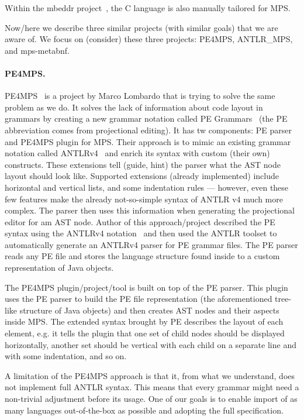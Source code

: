 Within the mbeddr project~\cite{ref:mbeddr}, the C language is also manually tailored for MPS.

Now/here we describe three similar projects (with similar goals) that we are aware of.
We focus on (consider) these three projects: PE4MPS, ANTLR{\_}MPS, and mps-metabnf.

\paragraph{PE4MPS.}
PE4MPS~\cite{ref:PE4MPS} is a project by Marco Lombardo that is trying to solve the same problem as we do.
It solves the lack of information about code layout in grammars by creating a new grammar notation called PE Grammars~\cite{ref:PE} (the PE abbreviation comes from projectional editing).
It has tw components: PE parser and PE4MPS plugin for MPS.
Their approach is to mimic an existing grammar notation called ANTLRv4~\cite{ANTLR4} and enrich its syntax with custom (their own) constructs.
These extensions tell (guide, hint) the parser what the AST node layout should look like.
Supported extensions (already implemented) include horizontal and vertical lists, and some indentation rules --- however, even these few features make the already not-so-simple syntax of ANTLR v4 much more complex.
The parser then uses this information when generating the projectional editor for am AST node.
Author of this approach/project described the PE syntax using the ANTLRv4 notation~\cite{ANTLR4reference} and then used the ANTLR toolset to automatically generate an ANTLRv4 parser for PE grammar files.
The PE parser reads any PE file and stores the language structure found inside to a custom representation of Java objects.

The PE4MPS plugin/project/tool is built on top of the PE parser.
This plugin uses the PE parser to build the PE file representation (the aforementioned tree-like structure of Java objects) and then creates AST nodes and their aspects inside MPS.
The extended syntax brought by PE describes the layout of each element, e.g. it tells the plugin that one set of child nodes should be displayed horizontally, another set should be vertical with each child on a separate line and with some indentation, and so on.

A limitation of the PE4MPS approach is that it, from what we understand, does not implement full ANTLR syntax.
This means that every grammar might need a non-trivial adjustment before its usage.
One of our goals is to enable import of as many languages out-of-the-box as possible and adopting the full specification.

